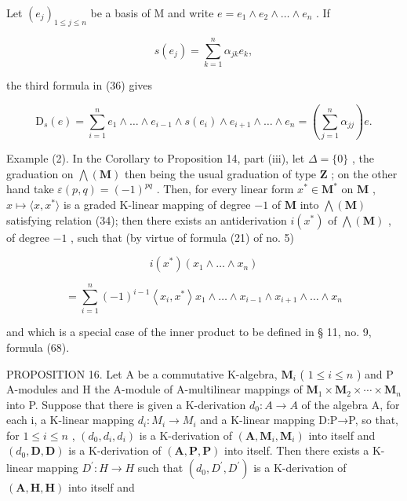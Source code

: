 Let \((e_j)_{1\leqslant j\leqslant n}\) be a basis of M and write \(e = e_1\wedge e_2\wedge \dots \wedge e_n\) . If

\[
s (e _ {j}) = \sum_ {k = 1} ^ {n} \alpha_ {j k} e _ {k},
\]

the third formula in (36) gives

\[
\mathrm{D} _ {s} (e) = \sum_ {i = 1} ^ {n} e _ {1} \wedge \dots \wedge e _ {i - 1} \wedge s \left(e _ {i}\right) \wedge e _ {i + 1} \wedge \dots \wedge e _ {n} = \left(\sum_ {j = 1} ^ {n} \alpha_ {j j}\right) e.
\]

Example (2). In the Corollary to Proposition 14, part (iii), let \(\Delta = \{0\}\) , the graduation on \(\bigwedge (\mathbf{M})\) then being the usual graduation of type \(\mathbf{Z}\) ; on the other hand take \(\varepsilon(p, q) = (-1)^{pq}\) . Then, for every linear form \(x^{*} \in \mathbf{M}^{*}\) on \(\mathbf{M}\) , \(x \mapsto \langle x, x^{*} \rangle\) is a graded K-linear mapping of degree \(-1\) of \(\mathbf{M}\) into \(\bigwedge (\mathbf{M})\) satisfying relation (34); then there exists an antiderivation \(i(x^{*})\) of \(\bigwedge (\mathbf{M})\) , of degree \(-1\) , such that (by virtue of formula (21) of no. 5)

\[
i \left(x ^ {*}\right) \left(x _ {1} \wedge \dots \wedge x _ {n}\right)
\]

\[
= \sum_ {i = 1} ^ {n} (- 1) ^ {i - 1} \left\langle x _ {i}, x ^ {*} \right\rangle x _ {1} \wedge \dots \wedge x _ {i - 1} \wedge x _ {i + 1} \wedge \dots \wedge x _ {n}
\]

and which is a special case of the inner product to be defined in § 11, no. 9, formula (68).

PROPOSITION 16. Let A be a commutative K-algebra, \(\mathbf{M}_i\) ( \(1 \leqslant i \leqslant n\) ) and P A-modules and H the A-module of A-multilinear mappings of \(\mathbf{M}_1 \times \mathbf{M}_2 \times \cdots \times \mathbf{M}_n\) into P. Suppose that there is given a K-derivation \(d_{0}:A\to A\) of the algebra A, for each i, a K-linear mapping \(d_{i}:M_{i}\to M_{i}\) and a K-linear mapping D:P→P, so that, for \(1\leqslant i\leqslant n\) , \((d_{0},d_{i},d_{i})\) is a K-derivation of \((\mathbf{A},\mathbf{M}_{i},\mathbf{M}_{i})\) into itself and \((d_{0},\mathbf{D},\mathbf{D})\) is a K-derivation of \((\mathbf{A},\mathbf{P},\mathbf{P})\) into itself. Then there exists a K-linear mapping \(D^{\prime}:H\to H\) such that \((d_{0},D^{\prime},D^{\prime})\) is a K-derivation of \((\mathbf{A},\mathbf{H},\mathbf{H})\) into itself and

